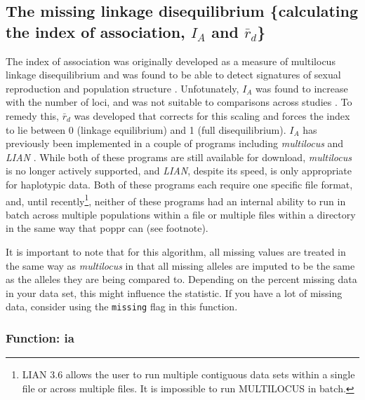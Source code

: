 \documentclass[letterpaper]{article}\usepackage[]{graphicx}\usepackage[]{color}
\newcommand{\tab}{\hspace*{1em}}
\begin{document}
\subsection{The missing linkage disequilibrium \{calculating the index of association, $I_A$ and $\bar r_d$\}}\label{index:iard}

\tab\tab The index of association was originally developed as a measure of multilocus linkage disequilibrium \cite{Brown:1980} and was found to be able to detect signatures of sexual reproduction and population structure \cite{Brown:1980, Smith:1993}. Unfotunately, $I_A$ was found to increase with the number of loci, and was not suitable to comparisons across studies \cite{Agapow:2001}. To remedy this, $\bar{r}_d$ was developed that corrects for this scaling and forces the index to lie between 0 (linkage equilibrium) and 1 (full disequilibrium). $I_A$ has previously been implemented in a couple of programs including \textit{multilocus} \cite{Agapow:2001} and \textit{LIAN} \cite{Haubold:2000}. While both of these programs are still available for download, \textit{multilocus} is no longer actively supported, and \textit{LIAN}, despite its speed, is only appropriate for haplotypic data. Both of these programs each require one specific file format, and, until recently\footnote{LIAN 3.6 allows the user to run multiple contiguous data sets within a single file or across multiple files. It is impossible to run MULTILOCUS in batch.}, neither of these programs had an internal ability to run in batch across multiple populations within a file or multiple files within a directory in the same way that poppr can (see footnote).

It is important to note that for this algorithm, all missing values are treated in the same way as \textit{multilocus} in that all missing alleles are imputed to be the same as the alleles they are being compared to. Depending on the percent missing data in your data set, this might influence the statistic. If you have a lot of missing data, consider using the \texttt{missing} flag in this function.
\subsubsection{Function: ia}\label{index:iard:ia}
\end{document}
